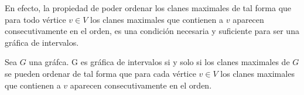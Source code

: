 En efecto, la propiedad de poder ordenar los clanes maximales de tal forma que para todo vértice $v\in V$ los clanes maximales que contienen a $v$ aparecen consecutivamente en el orden, es una condición necesaria y suficiente para ser una gráfica de intervalos. 

\begin{teorema}
    \label{teo:Int-MaxClns}
    Sea $G$ una gráfca. G es gráfica de intervalos si y solo si los clanes maximales de $G$ se pueden ordenar de tal forma que para cada vértice $v\in V$ los clanes maximales que contienen a $v$ aparecen consecutivamente en el orden.
\end{teorema}

